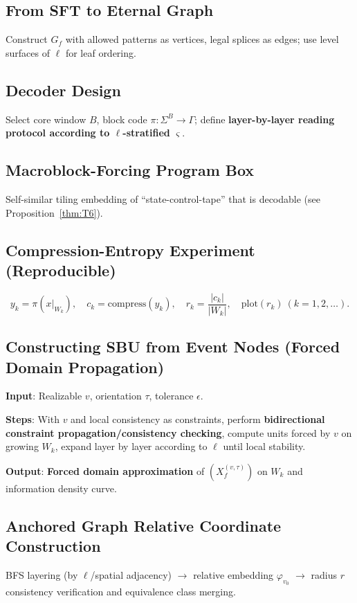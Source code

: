 \documentclass[11pt]{article}
\theoremstyle{definition}
\theoremstyle{remark}
\begin{document}
\subsection{From SFT to Eternal Graph}
Construct \( G_f \) with allowed patterns as vertices, legal splices as edges; use level surfaces of \( \ell \) for leaf ordering.

\subsection{Decoder Design}
Select core window \( B \), block code \( \pi: \Sigma^B \to \Gamma \); define \textbf{layer-by-layer reading protocol according to \( \ell \)-stratified} \( \varsigma \).

\subsection{Macroblock-Forcing Program Box}
Self-similar tiling embedding of ``state-control-tape'' that is decodable (see Proposition~\ref{thm:T6}).

\subsection{Compression-Entropy Experiment (Reproducible)}
\[
y_k = \pi(x|_{W_k}), \quad c_k = \mathrm{compress}(y_k), \quad r_k = \frac{|c_k|}{|W_k|}, \quad \mathrm{plot}(r_k) \ (k=1,2,\ldots).
\]

\subsection{Constructing SBU from Event Nodes (Forced Domain Propagation)}
\textbf{Input}: Realizable \( v \), orientation \( \tau \), tolerance \( \epsilon \).

\textbf{Steps}: With \( v \) and local consistency as constraints, perform \textbf{bidirectional constraint propagation/consistency checking}, compute units forced by \( v \) on growing \( W_k \), expand layer by layer according to \( \ell \) until local stability.

\textbf{Output}: \textbf{Forced domain approximation} of \( (X_f^{(v,\tau)}) \) on \( W_k \) and information density curve.

\subsection{Anchored Graph Relative Coordinate Construction}
BFS layering (by \( \ell \)/spatial adjacency) \( \to \) relative embedding \( \varphi_{v_0} \) \( \to \) radius \( r \) consistency verification and equivalence class merging.
\end{document}

